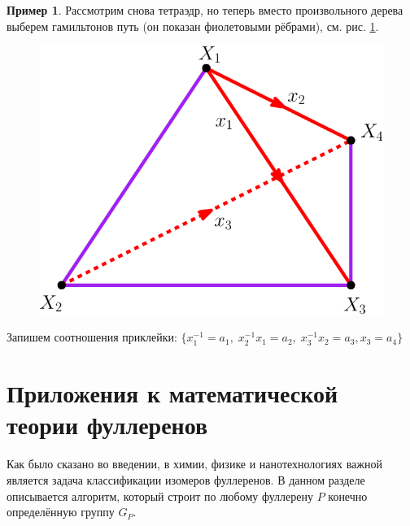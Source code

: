 \documentclass[14pt, dvipsnames, twoside]{extarticle}
\theoremstyle{definition}
\newtheorem{example}{Пример}
\theoremstyle{remark}
\begin{document}
\begin{example}

Рассмотрим снова тетраэдр, но теперь вместо произвольного дерева выберем гамильтонов путь (он показан фиолетовыми рёбрами), см. рис. \ref{pict_tetrahedron_hamilt}.

\begin{figure}
\begin{center}
\includegraphics[scale=0.8]{tetrahedron_hamilt}
\caption{}\label{pict_tetrahedron_hamilt}
\end{center}
\end{figure}

Запишем соотношения приклейки: $\{ x_1^{-1} = a_1,\; x_2^{-1}x_1 = a_2, \; x_3^{-1}x_2 = a_3, x_3 = a_4 \}$




\end{example}















\section{Приложения к математической теории фуллеренов}

Как было сказано во введении, в химии, физике и нанотехнологиях важной является задача классификации изомеров фуллеренов. В данном разделе описывается алгоритм, который строит по любому фуллерену $P$ конечно определённую группу $G_P$.    
\end{document}
